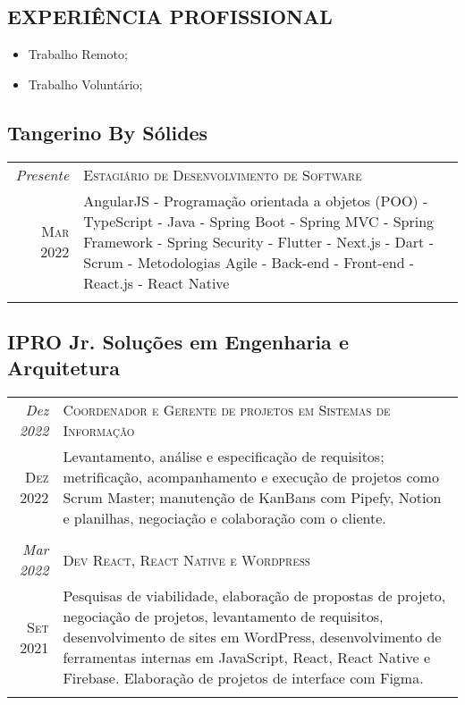 \begin{framed}
\section{EXPERIÊNCIA PROFISSIONAL}
\begin{itemize}
  \item Trabalho Remoto;
  \item Trabalho Voluntário;

\end{itemize}

\subsection{  Tangerino By Sólides}

\begin{tabular}{r|p{15cm}}
\emph{Presente}   & \textsc{Estagiário de Desenvolvimento de Software} \\
\textsc{Mar 2022} & \footnotesize{AngularJS - Programação orientada a objetos (POO) - TypeScript - Java - Spring Boot - Spring MVC - Spring Framework - Spring Security - Flutter - Next.js - Dart - Scrum - Metodologias Agile - Back-end - Front-end - React.js - React Native}\\
\multicolumn{2}{c}{}
\end{tabular}


\subsection{  IPRO Jr. Soluções em Engenharia e Arquitetura}

\begin{tabular}{r|p{15cm}}
\emph{Dez 2022}   & \textsc{Coordenador e Gerente de projetos em Sistemas de Informação }\\
\textsc{Dez 2022} & \footnotesize{Levantamento, análise e especificação de requisitos; metrificação, acompanhamento e execução de projetos como Scrum Master; manutenção de KanBans com Pipefy, Notion e planilhas, negociação e colaboração com o cliente.}\\
\multicolumn{2}{c}{}\\

\emph{Mar 2022}   & \textsc{Dev React, React Native e Wordpress }   \\
\textsc{Set 2021} & \footnotesize{Pesquisas de viabilidade, elaboração de propostas de projeto, negociação de projetos, levantamento de requisitos, desenvolvimento de sites em WordPress, desenvolvimento de ferramentas internas em JavaScript, React, React Native e Firebase. Elaboração de projetos de interface com Figma.} \\
\multicolumn{2}{c}{} \\


\end{tabular}
\end{framed}

